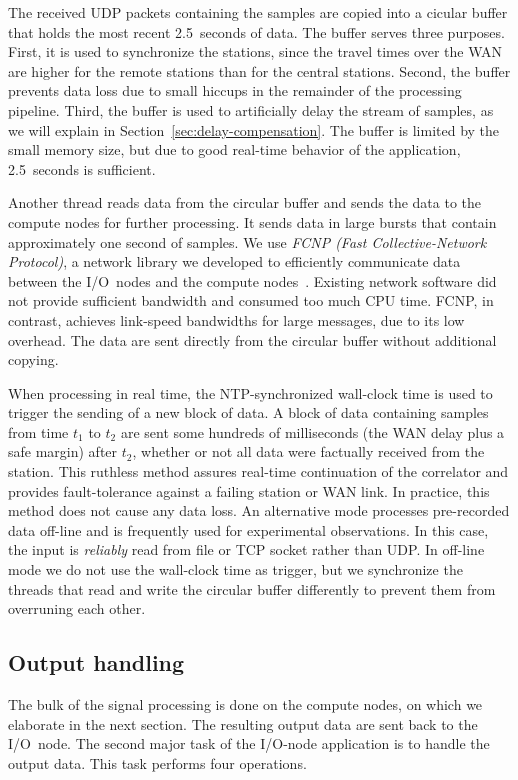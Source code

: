 \documentclass[conference]{IEEEtran}
\begin{document}
The received UDP packets containing the samples are copied into a cicular buffer that holds the most recent
2.5~seconds of data.
The buffer serves three purposes.
First, it is used to synchronize the stations, since the travel times over
the WAN are higher for the remote stations than for the central stations.
Second, the buffer prevents data loss due to small hiccups in the remainder
of the processing pipeline.
Third, the buffer is used to artificially delay the stream of samples,
as we will explain in Section~\ref{sec:delay-compensation}.
The buffer is limited by the small memory size, but due to good real-time
behavior of the application, 2.5~seconds is sufficient.

Another thread reads data from the circular buffer and sends the data to
the compute nodes for further processing.
It sends data in large bursts that contain approximately one second of samples.
We use \emph{FCNP (Fast Collective-Network Protocol)}, a 
network library we developed to efficiently communicate data between the I/O~nodes and the
compute nodes~\cite{Romein:09a}.
Existing network software did not provide sufficient bandwidth and consumed
too much CPU time.
FCNP, in contrast, achieves link-speed bandwidths for large messages, due to
its low overhead.
The data are sent directly from the circular buffer without additional copying.

When processing in real time, the NTP-synchronized wall-clock time
is used to trigger the sending of a new block of data.
A block of data containing samples from time $t_1$ to $t_2$ are sent some hundreds
of milliseconds (the WAN delay plus a safe margin) after $t_2$, whether or
not all data were factually received from the station.
This ruthless method assures real-time continuation of the correlator and
provides fault-tolerance against a failing station or WAN link.
In practice, this method does not cause any data loss.
An alternative mode processes pre-recorded data off-line and is frequently used
for experimental observations.
In this case, the input is \emph{reliably} read from file or TCP socket rather than
UDP.
In off-line mode we do not use the wall-clock time as
trigger, but we synchronize the threads that read and write the circular
buffer differently to prevent them from overruning each other.


\subsection{Output handling}

The bulk of the signal processing is done on the compute nodes, on which we
elaborate in the next section.
The resulting output data are sent back to the I/O~node.
The second major task of the I/O-node application is to handle the output data.
This task performs four operations.
\end{document}
